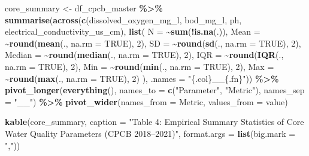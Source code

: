 \documentclass[
]{article}
\newenvironment{Shaded}{\begin{snugshade}}{\end{snugshade}}
\newcommand{\AttributeTok}[1]{\textcolor[rgb]{0.13,0.29,0.53}{#1}}
\newcommand{\ConstantTok}[1]{\textcolor[rgb]{0.56,0.35,0.01}{#1}}
\newcommand{\DecValTok}[1]{\textcolor[rgb]{0.00,0.00,0.81}{#1}}
\newcommand{\FunctionTok}[1]{\textcolor[rgb]{0.13,0.29,0.53}{\textbf{#1}}}
\newcommand{\NormalTok}[1]{#1}
\newcommand{\OtherTok}[1]{\textcolor[rgb]{0.56,0.35,0.01}{#1}}
\newcommand{\SpecialCharTok}[1]{\textcolor[rgb]{0.81,0.36,0.00}{\textbf{#1}}}
\newcommand{\StringTok}[1]{\textcolor[rgb]{0.31,0.60,0.02}{#1}}
\begin{document}
\begin{Shaded}
\begin{Highlighting}[]
\NormalTok{core\_summary }\OtherTok{\textless{}{-}}\NormalTok{ df\_cpcb\_master }\SpecialCharTok{\%\textgreater{}\%} 
  \FunctionTok{summarise}\NormalTok{(}\FunctionTok{across}\NormalTok{(}\FunctionTok{c}\NormalTok{(dissolved\_oxygen\_mg\_l, bod\_mg\_l, ph, electrical\_conductivity\_us\_cm), }\FunctionTok{list}\NormalTok{(}
    \AttributeTok{N      =} \SpecialCharTok{\textasciitilde{}}\FunctionTok{sum}\NormalTok{(}\SpecialCharTok{!}\FunctionTok{is.na}\NormalTok{(.)),}
    \AttributeTok{Mean   =} \SpecialCharTok{\textasciitilde{}}\FunctionTok{round}\NormalTok{(}\FunctionTok{mean}\NormalTok{(., }\AttributeTok{na.rm =} \ConstantTok{TRUE}\NormalTok{), }\DecValTok{2}\NormalTok{),}
    \AttributeTok{SD     =} \SpecialCharTok{\textasciitilde{}}\FunctionTok{round}\NormalTok{(}\FunctionTok{sd}\NormalTok{(., }\AttributeTok{na.rm =} \ConstantTok{TRUE}\NormalTok{), }\DecValTok{2}\NormalTok{),}
    \AttributeTok{Median =} \SpecialCharTok{\textasciitilde{}}\FunctionTok{round}\NormalTok{(}\FunctionTok{median}\NormalTok{(., }\AttributeTok{na.rm =} \ConstantTok{TRUE}\NormalTok{), }\DecValTok{2}\NormalTok{),}
    \AttributeTok{IQR    =} \SpecialCharTok{\textasciitilde{}}\FunctionTok{round}\NormalTok{(}\FunctionTok{IQR}\NormalTok{(., }\AttributeTok{na.rm =} \ConstantTok{TRUE}\NormalTok{), }\DecValTok{2}\NormalTok{),}
    \AttributeTok{Min    =} \SpecialCharTok{\textasciitilde{}}\FunctionTok{round}\NormalTok{(}\FunctionTok{min}\NormalTok{(., }\AttributeTok{na.rm =} \ConstantTok{TRUE}\NormalTok{), }\DecValTok{2}\NormalTok{),}
    \AttributeTok{Max    =} \SpecialCharTok{\textasciitilde{}}\FunctionTok{round}\NormalTok{(}\FunctionTok{max}\NormalTok{(., }\AttributeTok{na.rm =} \ConstantTok{TRUE}\NormalTok{), }\DecValTok{2}\NormalTok{)}
\NormalTok{  ), }\AttributeTok{.names =} \StringTok{"\{.col\}\_\_\{.fn\}"}\NormalTok{)) }\SpecialCharTok{\%\textgreater{}\%} 
  \FunctionTok{pivot\_longer}\NormalTok{(}\FunctionTok{everything}\NormalTok{(), }\AttributeTok{names\_to =} \FunctionTok{c}\NormalTok{(}\StringTok{"Parameter"}\NormalTok{, }\StringTok{"Metric"}\NormalTok{), }\AttributeTok{names\_sep =} \StringTok{"\_\_"}\NormalTok{) }\SpecialCharTok{\%\textgreater{}\%} 
  \FunctionTok{pivot\_wider}\NormalTok{(}\AttributeTok{names\_from =}\NormalTok{ Metric, }\AttributeTok{values\_from =}\NormalTok{ value)}

\FunctionTok{kable}\NormalTok{(core\_summary, }\AttributeTok{caption =} \StringTok{"Table 4: Empirical Summary Statistics of Core Water Quality Parameters (CPCB 2018–2021)"}\NormalTok{,}
      \AttributeTok{format.args =} \FunctionTok{list}\NormalTok{(}\AttributeTok{big.mark =} \StringTok{","}\NormalTok{))}
\end{Highlighting}
\end{Shaded}
\end{document}
